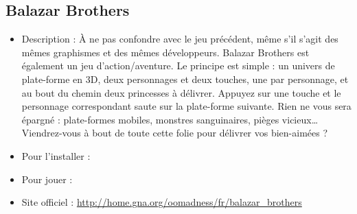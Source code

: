 \subsection{Balazar Brothers}
\begin{itemize}
\begingroup
{}
\item Description : À ne pas confondre avec le jeu précédent, même s'il s'agit des mêmes graphismes et des mêmes développeurs. Balazar Brothers est également un jeu d'action/aventure. Le principe est simple : un univers de plate-forme en 3D, deux personnages et deux touches, une par personnage, et au bout du chemin deux princesses à délivrer. Appuyez sur une touche et le personnage correspondant saute sur la plate-forme suivante. Rien ne vous sera épargné : plate-formes mobiles, monstres sanguinaires, pièges vicieux\ldots{} Viendrez-vous à bout de toute cette folie pour délivrer vos bien-aimées ?{\par}
\endgroup
\item Pour l'installer : 
\item Pour jouer : 
\item Site officiel : \url{http://home.gna.org/oomadness/fr/balazar_brothers}{\par}
\end{itemize}
